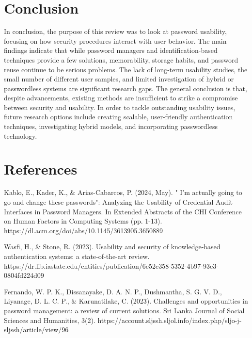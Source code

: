\documentclass[12pt,a4paper]{article}
\begin{document}

\section{Conclusion}

In conclusion, the purpose of this review was to look at password usability, focusing on how security procedures interact with user behavior. The main findings indicate that while password managers and identification-based techniques provide a few solutions, memorability, storage habits, and password reuse continue to be serious problems.
The lack of long-term usability studies, the small number of different user samples, and limited investigation of hybrid or passwordless systems are significant research gaps. The general conclusion is that, despite advancements, existing methods are insufficient to strike a compromise between security and usability.
In order to tackle outstanding usability issues, future research options include creating scalable, user-friendly authentication techniques, investigating hybrid models, and incorporating passwordless technology.








\newpage

\section{References}


Kablo, E., Kader, K., \& Arias-Cabarcos, P. (2024, May). " I'm actually going to go and change these passwords": Analyzing the Usability of Credential Audit Interfaces in Password Managers. In Extended Abstracts of the CHI Conference on Human Factors in Computing Systems (pp. 1-13). 
https://dl.acm.org/doi/abs/10.1145/3613905.3650889

\vspace{0.4cm}

Wasfi, H., \& Stone, R. (2023). Usability and security of knowledge-based authentication systems: a state-of-the-art review. 
https://dr.lib.iastate.edu/entities/publication/6e52e358-5352-4b97-93e3-0804fd224d09

\vspace{0.4cm}

Fernando, W. P. K., Dissanayake, D. A. N. P., Dushmantha, S. G. V. D., Liyanage, D. L. C. P., \& Karunatilake, C. (2023). Challenges and opportunities in password management: a review of current solutions. Sri Lanka Journal of Social Sciences and Humanities, 3(2). 
https://account.sljssh.sljol.info/index.php/sljo-j-sljssh/article/view/96
\end{document}
